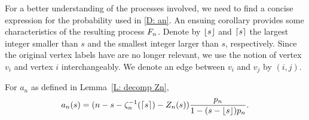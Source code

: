 For a better understanding of the processes involved, we need to find a concise expression for the probability used in \eqref{D: an}.
An ensuing corollary provides some characteristics of the resulting process $F_n$.
Denote by $\lfloor s\rfloor$ and $\lceil s\rceil$ the largest integer smaller than $s$ and the smallest integer larger than $s$, respectively.
Since the original vertex labels have are no longer relevant,
we use the notion of vertex $v_i$ and vertex $i$ interchangeably.
We denote an edge between $v_i$ and $v_j$ by $(i,j)$.

\begin{lemma} \label{L: formula an}
	For $a_n$ as defined in Lemma~\ref{L: decomp Zn},
	\begin{equation}
	a_n(s) = (n - s - \zeta^{-1}_n(\lceil s\rceil) - Z_n(s)) \frac{p_n}{1-(s-\lfloor s\rfloor)p_n} .
	\end{equation}
\end{lemma}

